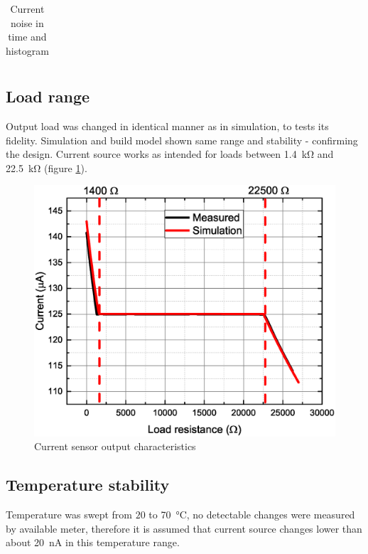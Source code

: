 \begin{table}[H]
\begin{center}
\begin{tabular}{cc}
                \end{tabular}
            \end{center}
            \caption{Current noise in time and histogram}
            \label{Current_Stability}
        \end{table}

    \subsection{Load range}
        Output load was changed in identical manner as in simulation, to tests its fidelity. Simulation and build model shown same range and stability - confirming the design. Current source works as intended for loads between \SI{1.4}{\kilo\ohm} and \SI{22.5}{\kilo\ohm} (figure \ref{Current_sensor_output_characteristics}).
        \begin{figure}[H]
            \centering
            \includegraphics[width=0.6\paperwidth]{img/07/output_resistance.eps}
            \caption{Current sensor output characteristics}
            \label{Current_sensor_output_characteristics}
        \end{figure}

    \subsection{Temperature stability}
        Temperature was swept from $20$ to \SI{70}{\degreeCelsius}, no detectable changes were measured by available meter, therefore it is assumed that current source changes lower than about \SI{20}{\nano\ampere} in this temperature range.

